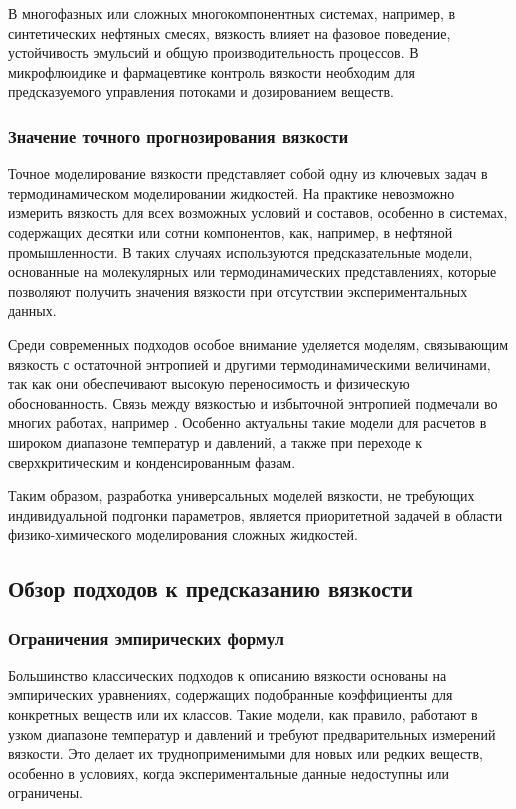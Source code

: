 \documentclass[a4paper,12pt]{article}
\begin{document}
      В многофазных или сложных многокомпонентных системах, например, в синтетических нефтяных смесях, вязкость влияет на фазовое поведение, устойчивость эмульсий и общую производительность процессов. В микрофлюидике и фармацевтике контроль вязкости необходим для предсказуемого управления потоками и дозированием веществ.

    \subsubsection{Значение точного прогнозирования вязкости}

      Точное моделирование вязкости представляет собой одну из ключевых задач в термодинамическом моделировании жидкостей. На практике невозможно измерить вязкость для всех возможных условий и составов, особенно в системах, содержащих десятки или сотни компонентов, как, например, в нефтяной промышленности. В таких случаях используются предсказательные модели, основанные на молекулярных или термодинамических представлениях, которые позволяют получить значения вязкости при отсутствии экспериментальных данных.

      Среди современных подходов особое внимание уделяется моделям, связывающим вязкость с остаточной энтропией и другими термодинамическими величинами, так как они обеспечивают высокую переносимость и физическую обоснованность. Связь между вязкостью и избыточной энтропией подмечали во многих работах, например \cite{taib2020residual}. Особенно актуальны такие модели для расчетов в широком диапазоне температур и давлений, а также при переходе к сверхкритическим и конденсированным фазам.

      Таким образом, разработка универсальных моделей вязкости, не требующих индивидуальной подгонки параметров, является приоритетной задачей в области физико-химического моделирования сложных жидкостей.

  \subsection{Обзор подходов к предсказанию вязкости}

    \subsubsection{Ограничения эмпирических формул}
      Большинство классических подходов к описанию вязкости основаны на эмпирических уравнениях, содержащих подобранные коэффициенты для конкретных веществ или их классов. Такие модели, как правило, работают в узком диапазоне температур и давлений и требуют предварительных измерений вязкости. Это делает их трудноприменимыми для новых или редких веществ, особенно в условиях, когда экспериментальные данные недоступны или ограничены. 
\end{document}
